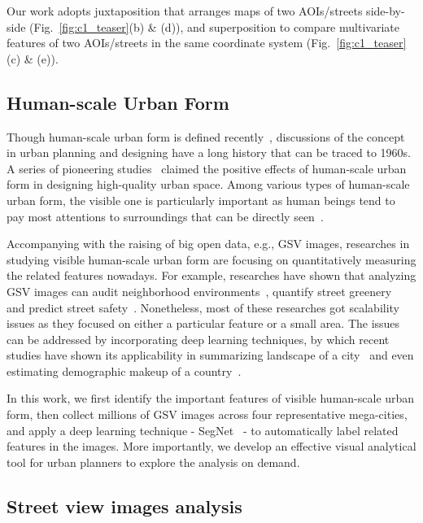 Our work adopts juxtaposition that arranges maps of two AOIs/streets side-by-side (Fig.~\ref{fig:c1_teaser}(b) \& (d)), and superposition to compare multivariate features of two AOIs/streets in the same coordinate system (Fig.~\ref{fig:c1_teaser}(c) \& (e)).

\subsection{Human-scale Urban Form}
Though human-scale urban form is defined recently~\cite{long_2016_human-scale}, discussions of the concept in urban planning and designing have a long history that can be traced to 1960s.
A series of pioneering studies~\cite{jacobs_1961_life, gehl_1971_life} claimed the positive effects of human-scale urban form in designing high-quality urban space.
Among various types of human-scale urban form, the visible one is particularly important as human beings tend to pay most attentions to surroundings that can be directly seen~\cite{gehl_1971_life}. 

Accompanying with the raising of big open data, e.g., GSV images, researches in studying visible human-scale urban form are focusing on quantitatively measuring the related features nowadays. 
For example, researches have shown that analyzing GSV images can audit neighborhood environments~\cite{rundle_2011_using}, quantify street greenery~\cite{li_2015_accessing} and predict street safety~\cite{naik2014streetscore}.
Nonetheless, most of these researches got scalability issues as they focused on either a particular feature or a small area.
The issues can be addressed by incorporating deep learning techniques, by which recent studies have shown its applicability in summarizing landscape of a city~\cite{doersch2015makes} and even estimating demographic makeup of a country~\cite{gebru2017using}.

\vspace{2mm}
In this work, we first identify the important features of visible human-scale urban form, then collect millions of GSV images across four representative mega-cities, and apply a deep learning technique - SegNet~\cite{Badrinarayanan_2015_segnet} - to automatically label related features in the images.
More importantly, we develop an effective visual analytical tool for urban planners to explore the analysis on demand.

\fi

\subsection{Street view images analysis}

